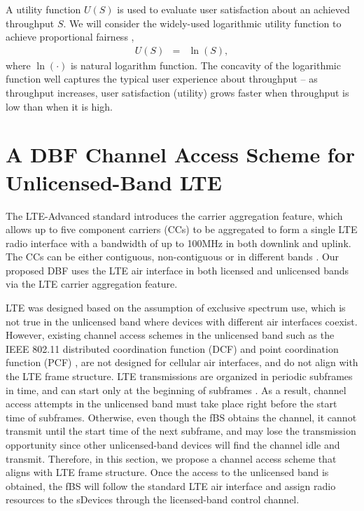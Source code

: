 \documentclass[journal,final,letterpaper,10pt,doublecolumn,twoside]{IEEEtran}
\begin{document}
A utility function $U(S)$ is used to evaluate user satisfaction about an achieved throughput $S$. We will consider the widely-used logarithmic  utility function  to achieve proportional fairness \cite{log_utility},
\begin{eqnarray}
U(S) &=& \ln(S), \label{eq:utilityfunction}
\end{eqnarray}
where $\ln(\cdot)$ is natural logarithm function. The concavity of the logarithmic  function well captures the typical user experience about throughput -- as throughput increases, user satisfaction (utility) grows faster when throughput is low than when it is high.




\section{A DBF Channel Access Scheme for Unlicensed-Band LTE}\label{sec: ch-access-scheme}
The LTE-Advanced standard \cite{LTE-A} introduces the carrier aggregation feature, which allows up to five component carriers (CCs) to be aggregated to form a single LTE radio interface with a bandwidth of up to 100MHz in both downlink and uplink. The CCs can be either contiguous, non-contiguous or in different bands \cite{LTE-A}.
Our proposed DBF uses the LTE air interface in both licensed and unlicensed bands via the LTE carrier aggregation feature.

LTE was designed based on the assumption of exclusive spectrum use,
which is not true in the unlicensed band where devices with
different air interfaces coexist. However, existing channel access
schemes in the unlicensed band such as the IEEE 802.11 distributed
coordination function (DCF) and point coordination function (PCF)
\cite{802.11-2007}, are not designed for cellular air interfaces,
and do not align with the LTE frame structure. LTE transmissions are
organized in periodic subframes in time, and can start only at the
beginning of subframes \cite{LTE-A}. As a result, channel access
attempts in the unlicensed band must take place right before the
start time of subframes. Otherwise, even though the fBS obtains the
channel, it cannot transmit until the start time of the next
subframe, and may lose the transmission opportunity since other
unlicensed-band devices will find the channel idle and transmit.
Therefore, in this section, we propose a channel access scheme that
aligns with LTE frame structure. Once the access to the unlicensed
band is obtained, the fBS will follow the standard LTE air interface and
assign radio resources to the sDevices through the licensed-band control
channel.
\end{document}
